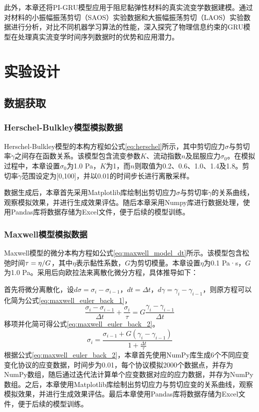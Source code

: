 此外，本章还将PI-GRU模型应用于阻尼黏弹性材料的真实流变学数据建模。通过对材料的小振幅振荡剪切（SAOS）实验数据和大振幅振荡剪切（LAOS）实验数据进行分析，对比不同机器学习算法的性能，深入探究了物理信息约束的GRU模型在处理真实流变学时间序列数据时的优势和应用潜力。
\section{实验设计}
\subsection{数据获取}
\subsubsection{Herschel-Bulkley模型模拟数据}
Herschel-Bulkley模型的本构方程如公式\eqref{eq:herschel}所示，其中剪切应力$\sigma$与剪切率$\dot{\gamma}$之间存在函数关系。该模型包含流变参数$K$、流动指数$n$及屈服应力$\sigma_0$。在模拟过程中，本章设置$\sigma_0$为1.0 Pa，$K$为1，而$n$则取值为0.2、0.6、1.0、1.4及1.8。剪切率$\dot{\gamma}$范围设定为[0,100]，并以0.01的时间步长进行离散采样。

数据生成后，本章首先采用Matplotlib库绘制出剪切应力$\sigma$与剪切率$\dot{\gamma}$的关系曲线，观察模拟效果，并进行生成效果评估。随后本章采用Numpy库进行数据处理，使用Pandas库将数据存储为Excel文件，便于后续的模型训练。
\subsubsection{Maxwell模型模拟数据}
Maxwell模型的微分本构方程如公式\eqref{eq:maxwell_model_dt}所示。该模型包含松弛时间$\tau=\eta/\\G$，其中$\eta$表示黏性系数，$G$为剪切模量。本章设置$\eta$为0.1 Pa·s，$G$为1.0 Pa。采用后向欧拉法来离散化微分方程，具体推导如下：

首先将微分离散化，设$d\sigma=\sigma_i - \sigma_{i-1}$，$dt=\Delta t$，$d\gamma=\gamma_i - \gamma_{i-1}$，则原方程可以化简为公式\eqref{eq:maxwell_euler_back_1}，
\begin{equation}
  \frac{\sigma_i - \sigma_{i-1}}{\Delta t} + \frac{\sigma_i}{\tau} = G \frac{\gamma_i - \gamma_{i-1}}{\Delta t} \label{eq:maxwell_euler_back_1}
\end{equation}
移项并化简可得公式\eqref{eq:maxwell_euler_back_2}。
\begin{equation}
  \sigma_i = \frac{\sigma_{i-1} + G (\gamma_i - \gamma_{i-1})}{1 + \frac{\Delta t}{\tau}} \label{eq:maxwell_euler_back_2}
\end{equation}
根据公式\eqref{eq:maxwell_euler_back_2}，本章首先使用NumPy库生成6个不同应变变化协议的应变数据，时间步为0.01，每个协议模拟2000个数据点，并存为NumPy数组，随后通过迭代法计算单个应变数据对应的应力数据，并存为NumPy数组。之后，本章使用Matplotlib库绘制出剪切应力与剪切应变的关系曲线，观察模拟效果，并进行生成效果评估。最后本章使用Pandas库将数据存储为Excel文件，便于后续的模型训练。
